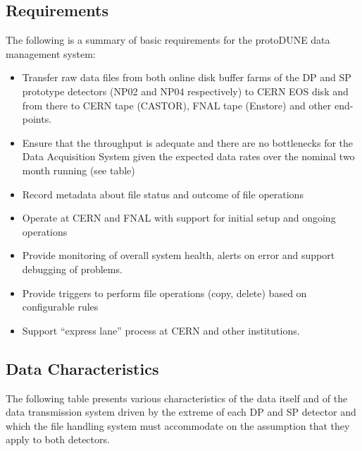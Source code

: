 \subsection{Requirements}
The following is a summary of basic requirements for the protoDUNE data management system:
\begin{itemize}

\item Transfer raw data files from both online disk buffer farms of the DP and SP prototype detectors (NP02 and NP04 respectively) to CERN EOS disk and from there to CERN tape (CASTOR), FNAL tape (Enstore) and other end-points.

\item Ensure that the throughput is adequate and there are no bottlenecks for the Data Acquisition System given the expected data rates over the nominal two month running (see table)

\item Record metadata about file status and outcome of file operations

\item Operate at CERN and FNAL with support for initial setup and ongoing operations
\item Provide monitoring of overall system health, alerts on error and support debugging of problems.

\item Provide triggers to perform file operations (copy, delete) based on configurable rules

\item Support “express lane” process at CERN and other institutions.

\end{itemize}

\subsection{Data Characteristics}
The following table presents various characteristics of the data itself and of the data transmission system driven by the extreme
of each DP and SP detector and which the file handling system must accommodate on the assumption that they apply to both detectors.

